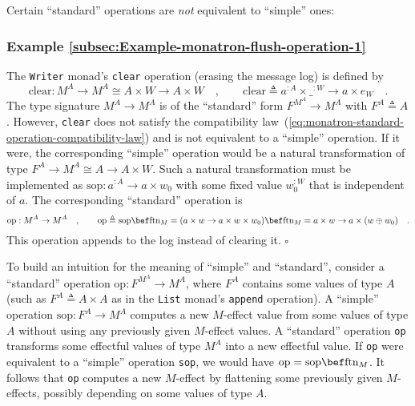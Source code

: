 Certain \textsf{``}standard\textsf{''} operations are \emph{not} equivalent to \textsf{``}simple\textsf{''}
ones:

\subsubsection{Example \label{subsec:Example-monatron-flush-operation-1}\ref{subsec:Example-monatron-flush-operation-1}}

The \lstinline!Writer! monad\textsf{'}s \lstinline!clear! operation (erasing
the message log) is defined by
\[
\text{clear}:M^{A}\rightarrow M^{A}\cong A\times W\rightarrow A\times W\quad,\quad\quad\text{clear}\triangleq a^{:A}\times\_^{:W}\rightarrow a\times e_{W}\quad.
\]
The type signature $M^{A}\rightarrow M^{A}$ is of the \textsf{``}standard\textsf{''}
form $F^{M^{A}}\rightarrow M^{A}$ with $F^{A}\triangleq A$. However,
\lstinline!clear! does not satisfy the compatibility law~(\ref{eq:monatron-standard-operation-compatibility-law})
and is not equivalent to a \textsf{``}simple\textsf{''} operation. If it were, the
corresponding \textsf{``}simple\textsf{''} operation would be a natural transformation
of type $F^{A}\rightarrow M^{A}\cong A\rightarrow A\times W$. Such
a natural transformation must be implemented as $\text{sop}:a^{:A}\rightarrow a\times w_{0}$
with some fixed value $w_{0}^{:W}$ that is independent of $a$. The
corresponding \textsf{``}standard\textsf{''} operation is 
\[
\text{op}:M^{A}\rightarrow M^{A}\quad,\quad\quad\text{op}\triangleq\text{sop}\bef\text{ftn}_{M}=(a\times w\rightarrow a\times w\times w_{0})\bef\text{ftn}_{M}=a\times w\rightarrow a\times(w\oplus w_{0})\quad.
\]
This operation appends to the log instead of clearing it. $\square$

To build an intuition for the meaning of \textsf{``}simple\textsf{''} and \textsf{``}standard\textsf{''},
consider a \textsf{``}standard\textsf{''} operation $\text{op}:F^{M^{A}}\rightarrow M^{A}$,
where $F^{A}$ contains some values of type $A$ (such as $F^{A}\triangleq A\times A$
as in the \lstinline!List! monad\textsf{'}s \lstinline!append! operation).
A \textsf{``}simple\textsf{''} operation $\text{sop}:F^{A}\rightarrow M^{A}$ computes
a new $M$-effect value from some values of type $A$ without using
any previously given $M$-effect values. A \textsf{``}standard\textsf{''} operation
\lstinline!op! transforms some effectful values of type $M^{A}$
into a new effectful value. If \lstinline!op! were equivalent to
a \textsf{``}simple\textsf{''} operation \lstinline!sop!, we would have $\text{op}=\text{sop}\bef\text{ftn}_{M}$.
It follows that \lstinline!op! computes a new $M$-effect by flattening
some previously given $M$-effects, possibly depending on some values
of type $A$. 


